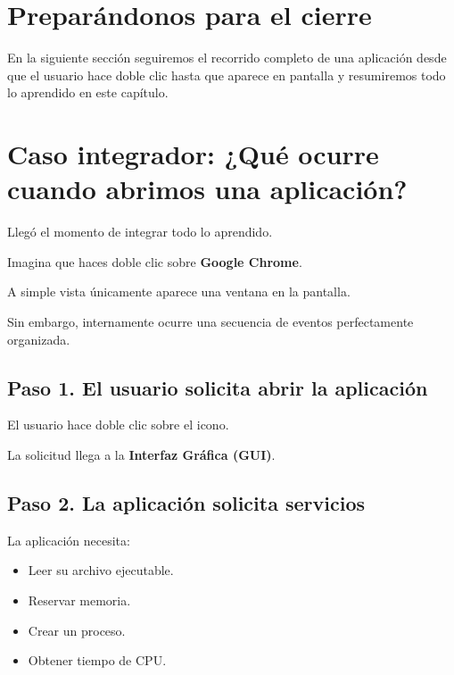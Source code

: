 \documentclass[
  spanish,
  letterpaper,
]{scrbook}
\providecommand{\tightlist}{%
  \setlength{\itemsep}{0pt}\setlength{\parskip}{0pt}}
\begin{document}

\chapter{Preparándonos para el
cierre}\label{preparuxe1ndonos-para-el-cierre-1}

En la siguiente sección seguiremos el recorrido completo de una
aplicación desde que el usuario hace doble clic hasta que aparece en
pantalla y resumiremos todo lo aprendido en este capítulo.


\chapter{Caso integrador: ¿Qué ocurre cuando abrimos una
aplicación?}\label{caso-integrador-quuxe9-ocurre-cuando-abrimos-una-aplicaciuxf3n}

Llegó el momento de integrar todo lo aprendido.

Imagina que haces doble clic sobre \textbf{Google Chrome}.

A simple vista únicamente aparece una ventana en la pantalla.

Sin embargo, internamente ocurre una secuencia de eventos perfectamente
organizada.

\section{Paso 1. El usuario solicita abrir la
aplicación}\label{paso-1.-el-usuario-solicita-abrir-la-aplicaciuxf3n}

El usuario hace doble clic sobre el icono.

La solicitud llega a la \textbf{Interfaz Gráfica (GUI)}.

\section{Paso 2. La aplicación solicita
servicios}\label{paso-2.-la-aplicaciuxf3n-solicita-servicios}

La aplicación necesita:

\begin{itemize}
\tightlist
\item
  Leer su archivo ejecutable.
\item
  Reservar memoria.
\item
  Crear un proceso.
\item
  Obtener tiempo de CPU.
\end{itemize}
\end{document}
